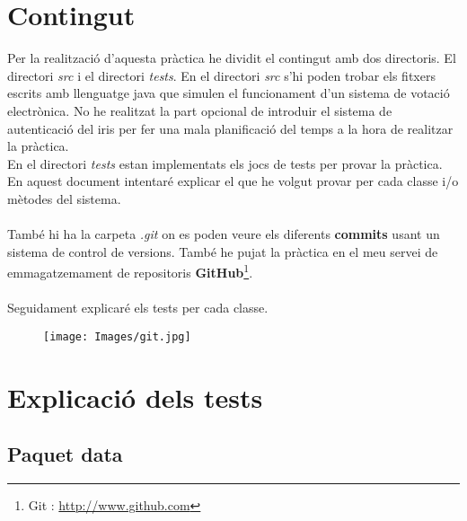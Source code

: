 \documentclass[11pt]{article}
\begin{document}
\section{Contingut}
Per la realització d'aquesta pràctica he dividit el contingut amb dos directoris. El directori \textit{src} i el directori \textit{tests}. En el directori \textit{src} s'hi poden trobar els fitxers escrits amb llenguatge java  que simulen el funcionament d'un sistema de votació electrònica. No he realitzat la part opcional de introduir el sistema de autenticació del iris per fer una mala planificació del temps a la hora de realitzar la pràctica.\\
En el directori \textit{tests} estan implementats els jocs de tests per provar la pràctica. En aquest document intentaré explicar el que he volgut provar per cada classe i/o mètodes del sistema.\\\\
També hi ha la carpeta \textit{.git} on es poden veure els diferents \textbf{commits} usant un sistema de control de versions. També he pujat la pràctica en el meu servei de emmagatzemament de repositoris \textbf{GitHub}\footnote{Git : \url{http://www.github.com}}.\\\\
Seguidament explicaré els tests per cada classe.
\begin{center}
	\begin{figure}[!ht]
		\texttt{[image: Images/git.jpg]}
	\end{figure}
\end{center}
\newpage
\section{Explicació dels tests}
	\subsection{Paquet data}
\end{document}
